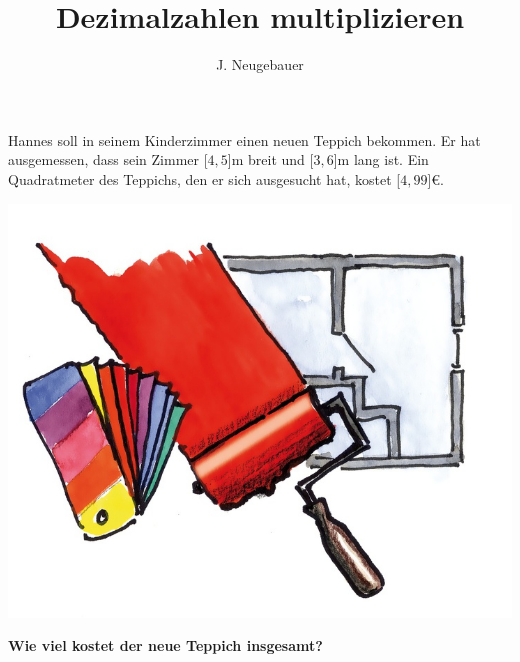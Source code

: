 \documentclass[11pt, a4paper]{scrartcl}
\author{J. Neugebauer}
\title{Dezimalzahlen multiplizieren}
\date{\Heute}
\begin{document}
	\LARGE

	Hannes soll in seinem Kinderzimmer einen neuen Teppich bekommen. Er hat ausgemessen, dass sein Zimmer \unit[$4,5$]{m} breit und \unit[$3,6$]{m} lang ist. Ein Quadratmeter des Teppichs, den er sich ausgesucht hat, kostet \unit[$4,99$]{\euro}.
	
	\begin{center}
	\includegraphics{6.15-Abb_Renovieren.jpg}
	
	\textbf{Wie viel kostet der neue Teppich insgesamt?}
	\end{center}
	
\end{document}
